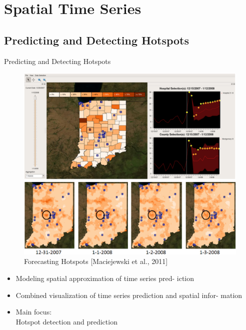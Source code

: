 \documentclass[10pt]{beamer}
\begin{document}



\section{Spatial Time Series}
\subsection{Predicting and Detecting Hotspots}
\begin{frame}{Predicting and Detecting Hotspots}
	\centering
	\begin{minipage}[c]{0.65\textwidth}
		\begin{figure}[htb]
			\includegraphics[width=\textwidth]{images/Hotspots_larger}
			\caption{Forecasting Hotspots [Maciejewski et al., 2011]}
		\end{figure}
	\end{minipage}
	\begin{minipage}[c]{0.325\textwidth}
			\begin{itemize}
				\item Modeling spatial approximation of time series pred- iction
				\item Combined visualization of time series prediction and spatial infor- mation
				\item Main focus:\\ Hotspot detection and prediction
			\end{itemize}
	\end{minipage}
\end{frame}
\end{document}
